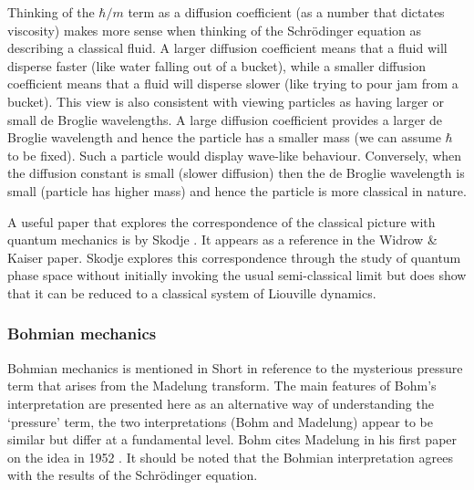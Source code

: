 Thinking of the $\hbar /m$ term as a diffusion coefficient (as a number that dictates viscosity) makes more sense when thinking of the Schr\"odinger equation as describing a classical fluid. A larger diffusion coefficient means that a fluid will disperse faster (like water falling out of a bucket), while a smaller diffusion coefficient means that a fluid will disperse slower (like trying to pour jam from a bucket). This view is also consistent with viewing particles as having larger or small de Broglie wavelengths. A large diffusion coefficient provides a larger de Broglie wavelength and hence the particle has a smaller mass (we can assume $\hbar$ to be fixed). Such a particle would display wave-like behaviour. Conversely, when the diffusion constant is small (slower diffusion) then the de Broglie wavelength is small (particle has higher mass) and hence the particle is more classical in nature.

A useful paper that explores the correspondence of the classical picture with quantum mechanics is by Skodje \citep{bib_skod}. It appears as a reference in the Widrow \& Kaiser paper. Skodje explores this correspondence through the study of quantum phase space without initially invoking the usual semi-classical limit but does show that it can be reduced to a classical system of Liouville dynamics.

\subsubsection{Bohmian mechanics}
\label{bohm_mech}
Bohmian mechanics is mentioned in Short \citep{bib_short} in reference to the mysterious pressure term that arises from the Madelung transform. The main features of Bohm's interpretation are presented here as an alternative way of understanding the `pressure' term, the two interpretations (Bohm and Madelung) appear to be similar but differ at a fundamental level. Bohm cites Madelung in his first paper on the idea in 1952 \citep{bib_bohm, bib_bohm2}. It should be noted that the Bohmian interpretation agrees with the results of the Schr\"odinger equation.

